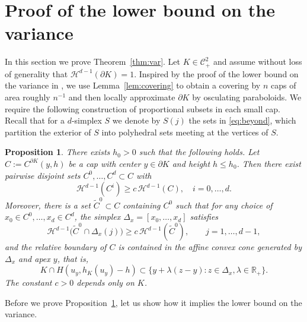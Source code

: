 \documentclass[12pt]{article}
\newcommand{\IR}{\mathds{R}}
\def\cC{{\mathcal C}}
\def\cH{{\mathcal H}}
\def\bd{{\partial}}
\newtheorem{proposition}[theorem]{Proposition}
\theoremstyle{definition}
\begin{document}
\section{Proof of the lower bound on the variance}\label{sec:var}

In this section we prove Theorem~\ref{thm:var}. Let $K\in \cC^2_+$ and assume without loss of generality that $\cH^{d-1}(\bd K)=1$. Inspired by the proof of the lower bound on the variance in \cite[Theorem~4]{Reitz05}, we use Lemma~\ref{lem:covering} to obtain a covering by $n$ caps of area roughly $n^{-1}$ and then locally approximate $\partial K$ by osculating paraboloids. We require the following construction of proportional subsets in each small cap. Recall that for a $d$-simplex $S$ we denote by $S(j)$ the sets in \eqref{eq:beyond}, which partition the exterior of $S$ into polyhedral sets meeting at the vertices of $S$.

\begin{proposition}\label{pro:lower-main}
	There exists $h_0>0$ such that the following holds. Let $C:=C^{\partial K}(y,h)$ be a cap with center $y\in \bd K$ and height $h\le h_0$. Then there exist pairwise disjoint sets $C^0,\dots,C^d\subset C$ with
\begin{equation} \label{eq:area-smallcaps}
	\cH^{d-1}(C^i)\ge c\,  \cH^{d-1}(C), \quad i=0,\dots,d.
\end{equation}
Moreover, there is a set $\tilde{C}^0\subset C$ containing $C^0$ such that for any choice of $x_0\in C^0,\dots, x_d\in C^d$, the simplex $\Delta_x=[x_0,\dots,x_d]$ satisfies 
\begin{equation} \label{eq:area-types}
	\cH^{d-1}\big(\tilde{C}^0\cap \Delta_x(j)\big)\ge c\, \cH^{d-1}(\tilde{C}^0),\qquad j=1,\dots,d-1,
\end{equation}
and  the relative boundary of $C$ is contained in the affine convex cone generated by $\Delta_x$ and apex $y$, that is,
\begin{equation} \label{eq:simplex-cone-affine}
	K\cap H(u_y,h_K(u_y)-h)\subset \{y+\lambda (z-y)\colon  z\in \Delta_x,\lambda\in \IR_+\}.
\end{equation}
The constant $c>0$ depends only on $K$.
\end{proposition}

Before we prove Proposition~\ref{pro:lower-main}, let us show how it implies the lower bound on the variance.
\end{document}
